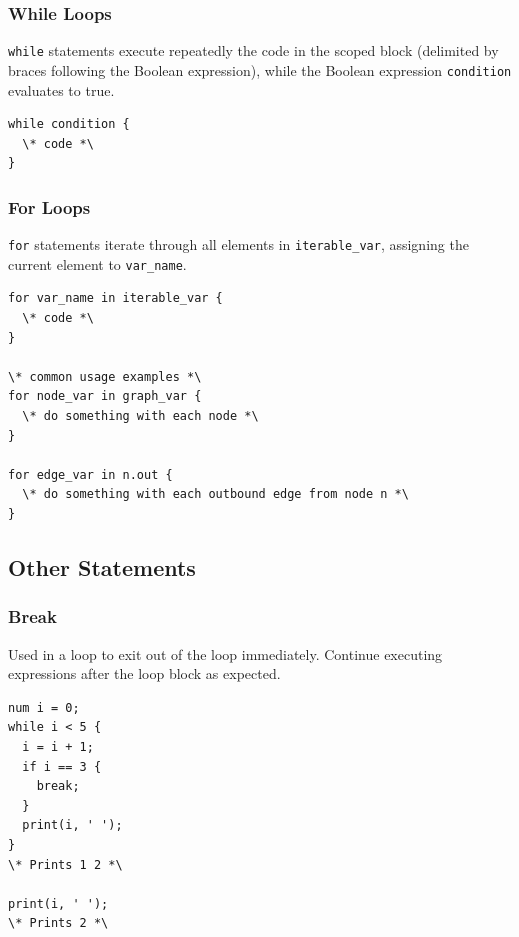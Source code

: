 \documentclass{article}
\newcommand{\code}[1]{\texttt{#1}} %
\begin{document}
\subsubsection{While Loops}

\code{while} statements execute repeatedly the code in the scoped block (delimited by braces following the Boolean expression), while the Boolean expression \code{condition} evaluates to true. 

\begin{lstlisting}[language=pltLang, label=lst:while-loop]
while condition {
  \* code *\
}

\end{lstlisting}

\subsubsection{For Loops}
\code{for} statements iterate through all elements in \code{iterable\_var}, assigning the current element to \code{var\_name}. 

\begin{lstlisting}[language=pltLang, label=lst:for-loop]
for var_name in iterable_var {
  \* code *\
}

\* common usage examples *\
for node_var in graph_var {
  \* do something with each node *\
}

for edge_var in n.out {
  \* do something with each outbound edge from node n *\
}

\end{lstlisting}

\subsection{Other Statements}

\subsubsection{Break}
Used in a loop to exit out of the loop immediately. Continue executing expressions after the loop block as expected.

\begin{lstlisting}[language=pltlang, label=lst:break-statement]
num i = 0;
while i < 5 {
  i = i + 1;
  if i == 3 {
    break;
  }
  print(i, ' ');
}
\* Prints 1 2 *\

print(i, ' ');
\* Prints 2 *\

\end{lstlisting}
\end{document}
